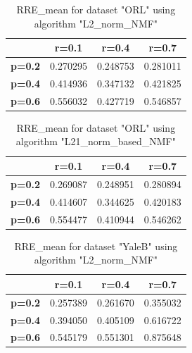\begin{table}[h]
\centering
\begin{tabular}{|c|c|c|c|}
\hline
\textbf{}      & \textbf{r=0.1} & \textbf{r=0.4} & \textbf{r=0.7} \\ \hline
\textbf{p=0.2} & 0.270295       & 0.248753       & 0.281011       \\ \hline
\textbf{p=0.4} & 0.414936       & 0.347132       & 0.421825       \\ \hline
\textbf{p=0.6} & 0.556032       & 0.427719       & 0.546857       \\ \hline
\end{tabular}
\caption{RRE\_mean for dataset "ORL" using algorithm "L2\_norm\_NMF"}
\end{table}

\begin{table}[h]
\centering
\begin{tabular}{|c|c|c|c|}
\hline
\multicolumn{1}{|c|}{\textbf{}} & \multicolumn{1}{c|}{\textbf{r=0.1}} & \multicolumn{1}{c|}{\textbf{r=0.4}} & \multicolumn{1}{c|}{\textbf{r=0.7}} \\ \hline
\textbf{p=0.2}                  & 0.269087                            & 0.248951                            & 0.280894                            \\ \hline
\textbf{p=0.4}                  & 0.414607                            & 0.344625                            & 0.420183                            \\ \hline
\textbf{p=0.6}                  & 0.554477                            & 0.410944                            & 0.546262                            \\ \hline
\end{tabular}
\caption{RRE\_mean for dataset "ORL" using algorithm "L21\_norm\_based\_NMF"}
\end{table}

\begin{table}[h]
\centering
\begin{tabular}{|c|c|c|c|}
\hline
\textbf{}      & \textbf{r=0.1} & \textbf{r=0.4} & \textbf{r=0.7} \\ \hline
\textbf{p=0.2} & 0.257389       & 0.261670       & 0.355032       \\ \hline
\textbf{p=0.4} & 0.394050       & 0.405109       & 0.616722       \\ \hline
\textbf{p=0.6} & 0.545179       & 0.551301       & 0.875648       \\ \hline
\end{tabular}
\caption{RRE\_mean for dataset "YaleB" using algorithm "L2\_norm\_NMF"}
\end{table}

